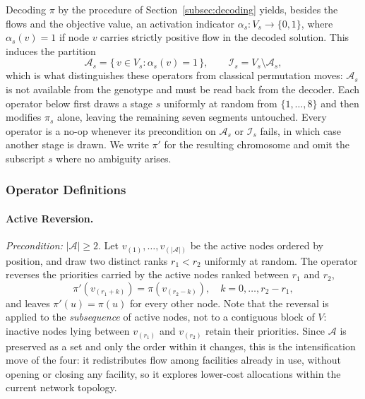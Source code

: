\documentclass[preprint,12pt,authoryear]{elsarticle}
\begin{document}
Decoding $\pi$ by the procedure of Section~\ref{subsec:decoding} yields, besides the flows and the objective value, an activation indicator $\alpha_s : V_s \rightarrow \{0,1\}$, where
$\alpha_s(v) = 1$ if node $v$ carries strictly positive flow in the decoded solution. This induces the partition
%
\begin{equation}
\label{eq:active_partition}
\mathcal{A}_s = \{\, v \in V_s : \alpha_s(v) = 1 \,\}, \qquad \mathcal{I}_s = V_s \setminus \mathcal{A}_s ,
\end{equation}
%
which is what distinguishes these operators from classical permutation moves: $\mathcal{A}_s$ is not available from the genotype and must be read back from the decoder. Each operator
below first draws a stage $s$ uniformly at random from $\{1, \dots, 8\}$ and then modifies $\pi_s$ alone, leaving the remaining seven segments untouched. Every operator is a no-op
whenever its precondition on $\mathcal{A}_s$ or $\mathcal{I}_s$ fails, in which case another stage is drawn. We write $\pi'$ for the resulting chromosome and omit the subscript $s$
where no ambiguity arises.

\subsubsection{Operator Definitions}
\label{subsubsec:op_definitions}

\paragraph{Active Reversion.} \textit{Precondition:} $|\mathcal{A}| \ge 2$. Let $v_{(1)}, \dots, v_{(|\mathcal{A}|)}$ be the active nodes ordered by position, and draw two distinct
ranks $r_1 < r_2$ uniformly at random. The operator reverses the priorities carried by the active nodes ranked between $r_1$ and $r_2$,
%
\begin{equation}
\label{eq:op_activereversion}
\pi'\!\left(v_{(r_1 + k)}\right) = \pi\!\left(v_{(r_2 - k)}\right), \quad k = 0, \dots, r_2 - r_1 ,
\end{equation}
%
and leaves $\pi'(u) = \pi(u)$ for every other node. Note that the reversal is applied to the \emph{subsequence} of active nodes, not to a contiguous block of $V$: inactive nodes lying
between $v_{(r_1)}$ and $v_{(r_2)}$ retain their priorities. Since $\mathcal{A}$ is preserved as a set and only the order within it changes, this is the intensification move of the
four: it redistributes flow among facilities already in use, without opening or closing any facility, so it explores lower-cost allocations within the current network topology.
\end{document}
